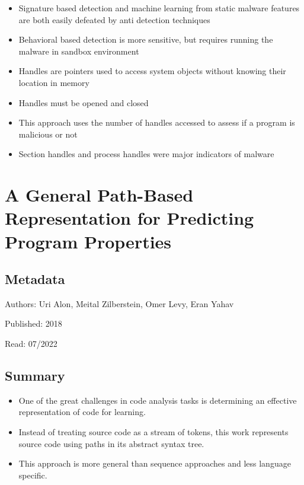 \documentclass{article}
\begin{document}
\begin{itemize}
	\item Signature based detection and machine learning from static malware features are both easily defeated by anti detection techniques
	\item Behavioral based detection is more sensitive, but requires running the malware in sandbox environment
	\item Handles are pointers used to access system objects without knowing their location in memory
	\item Handles must be opened and closed
	\item This approach uses the number of handles accessed to assess if a program is malicious or not
	\item Section handles and process handles were major indicators of malware
\end{itemize}

\pagebreak


\section*{A General Path-Based Representation for Predicting Program Properties}

\subsection*{Metadata}

\noindent Authors: Uri Alon, Meital Zilberstein, Omer Levy, Eran Yahav

\noindent Published: 2018

\noindent Read: 07/2022

\subsection*{Summary}
\begin{itemize}
\item One of the great challenges in code analysis tasks is determining an effective representation of code for learning.
\item Instead of treating source code as a stream of tokens, this work represents source code using paths in its abstract syntax tree.
\item This approach is more general than sequence approaches and less language specific.
\end{itemize}
\end{document}
